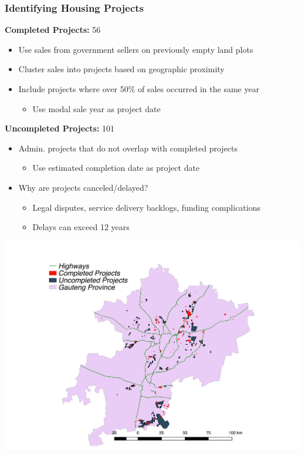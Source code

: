 \documentclass[aspectratio=149]{beamer}
\begin{document}
\begin{frame}
\frametitle{Identifying Housing Projects}
\label{data}
\textbf{Completed Projects:} 56
\begin{itemize}
\item Use sales from government sellers on previously empty land plots
\item Cluster sales into projects based on geographic proximity
\item Include projects where over 50\% of sales occurred in the same year
  \begin{itemize}
    \item Use modal sale year as project date
  \end{itemize}
\end{itemize}
\vspace{.4cm}
\textbf{Uncompleted Projects:} 101
\begin{itemize}
\item Admin. projects that do not overlap with completed projects
  \begin{itemize}
    \item Use estimated completion date as project date
  \end{itemize}
  \item Why are projects canceled/delayed? 
    \begin{itemize}
      \item Legal disputes, service delivery backlogs, funding complications
      \item Delays can exceed 12 years 
    \end{itemize} 
\end{itemize}
\hyperlink{dataappendix}{}
\end{frame}

\begin{frame}
\vspace*{-18mm}
\begin{center}
\hspace*{-17mm}
\includegraphics[scale=0.47]{full_map.pdf}
\vspace{-3mm}
\end{center}
\end{frame}
\end{document}
